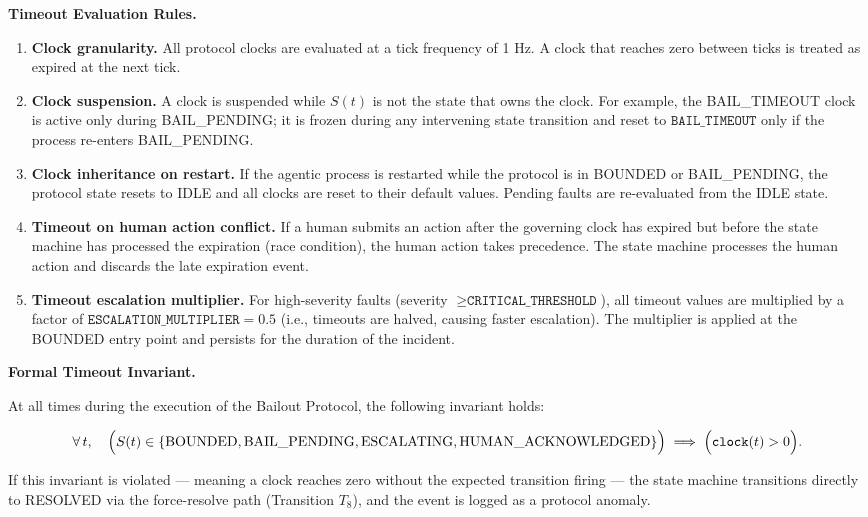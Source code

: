 \bigskip

\noindent\textbf{Timeout Evaluation Rules.}

\begin{enumerate}
  \item \textbf{Clock granularity.} All protocol clocks are evaluated at a tick frequency of 1 Hz. A clock that reaches zero between ticks is treated as expired at the next tick.
  \item \textbf{Clock suspension.} A clock is suspended while $S(t)$ is not the state that owns the clock. For example, the BAIL\_TIMEOUT clock is active only during BAIL\_PENDING; it is frozen during any intervening state transition and reset to $\texttt{BAIL\_TIMEOUT}$ only if the process re-enters BAIL\_PENDING.
  \item \textbf{Clock inheritance on restart.} If the agentic process is restarted while the protocol is in BOUNDED or BAIL\_PENDING, the protocol state resets to IDLE and all clocks are reset to their default values. Pending faults are re-evaluated from the IDLE state.
  \item \textbf{Timeout on human action conflict.} If a human submits an action after the governing clock has expired but before the state machine has processed the expiration (race condition), the human action takes precedence. The state machine processes the human action and discards the late expiration event.
  \item \textbf{Timeout escalation multiplier.} For high-severity faults (severity $\geq \texttt{CRITICAL\_THRESHOLD}$), all timeout values are multiplied by a factor of $\texttt{ESCALATION\_MULTIPLIER} = 0.5$ (i.e., timeouts are halved, causing faster escalation). The multiplier is applied at the BOUNDED entry point and persists for the duration of the incident.
\end{enumerate}

\bigskip

\noindent\textbf{Formal Timeout Invariant.}

At all times during the execution of the Bailout Protocol, the following invariant holds:

\begin{equation}
  \forall\, t,\quad \Bigl(S(t) \in \{\text{BOUNDED}, \text{BAIL\_PENDING}, \text{ESCALATING}, \text{HUMAN\_ACKNOWLEDGED}\}\Bigr) \implies \Bigl(\texttt{clock}(t) > 0 \Bigr).
\end{equation}

If this invariant is violated — meaning a clock reaches zero without the expected transition firing — the state machine transitions directly to RESOLVED via the force-resolve path (Transition $T_8$), and the event is logged as a protocol anomaly.

